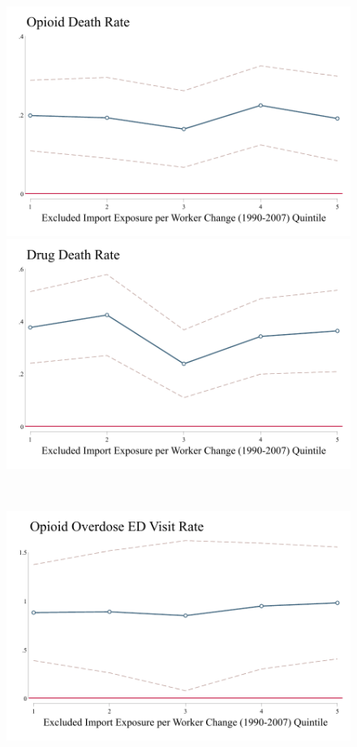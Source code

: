 \documentclass[12pt]{article}
\begin{document}
		\newpage
		\FloatBarrier
		\begin{figure}[h]
			\begin{minipage}[c]{0.48\linewidth}
				\centering
			  	\includegraphics[width=\linewidth]{../results/appendix/figures/opioid_by_imp_exp_quintile.pdf}
				\includegraphics[width=\linewidth]{../results/appendix/figures/drug_by_imp_exp_quintile.pdf}
			\end{minipage}
			~
			\hspace{0.05cm}
			\begin{minipage}[c]{0.48\linewidth}\centering
			  \centering
			 \includegraphics[width=\linewidth]{../results/appendix/figures/op_ovr_by_imp_exp_quintile.pdf}

\end{minipage}
\end{figure}
\end{document}
